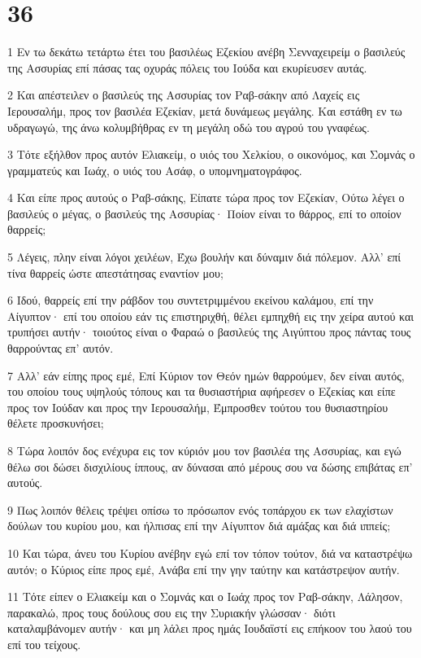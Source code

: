 \chapter{36}

\par 1 Εν τω δεκάτω τετάρτω έτει του βασιλέως Εζεκίου ανέβη Σενναχειρείμ ο βασιλεύς της Ασσυρίας επί πάσας τας οχυράς πόλεις του Ιούδα και εκυρίευσεν αυτάς.
\par 2 Και απέστειλεν ο βασιλεύς της Ασσυρίας τον Ραβ-σάκην από Λαχείς εις Ιερουσαλήμ, προς τον βασιλέα Εζεκίαν, μετά δυνάμεως μεγάλης. Και εστάθη εν τω υδραγωγώ, της άνω κολυμβήθρας εν τη μεγάλη οδώ του αγρού του γναφέως.
\par 3 Τότε εξήλθον προς αυτόν Ελιακείμ, ο υιός του Χελκίου, ο οικονόμος, και Σομνάς ο γραμματεύς και Ιωάχ, ο υιός του Ασάφ, ο υπομνηματογράφος.
\par 4 Και είπε προς αυτούς ο Ραβ-σάκης, Είπατε τώρα προς τον Εζεκίαν, Ούτω λέγει ο βασιλεύς ο μέγας, ο βασιλεύς της Ασσυρίας· Ποίον είναι το θάρρος, επί το οποίον θαρρείς;
\par 5 Λέγεις, πλην είναι λόγοι χειλέων, Έχω βουλήν και δύναμιν διά πόλεμον. Αλλ' επί τίνα θαρρείς ώστε απεστάτησας εναντίον μου;
\par 6 Ιδού, θαρρείς επί την ράβδον του συντετριμμένου εκείνου καλάμου, επί την Αίγυπτον· επί του οποίου εάν τις επιστηριχθή, θέλει εμπηχθή εις την χείρα αυτού και τρυπήσει αυτήν· τοιούτος είναι ο Φαραώ ο βασιλεύς της Αιγύπτου προς πάντας τους θαρρούντας επ' αυτόν.
\par 7 Αλλ' εάν είπης προς εμέ, Επί Κύριον τον Θεόν ημών θαρρούμεν, δεν είναι αυτός, του οποίου τους υψηλούς τόπους και τα θυσιαστήρια αφήρεσεν ο Εζεκίας και είπε προς τον Ιούδαν και προς την Ιερουσαλήμ, Έμπροσθεν τούτου του θυσιαστηρίου θέλετε προσκυνήσει;
\par 8 Τώρα λοιπόν δος ενέχυρα εις τον κύριόν μου τον βασιλέα της Ασσυρίας, και εγώ θέλω σοι δώσει δισχιλίους ίππους, αν δύνασαι από μέρους σου να δώσης επιβάτας επ' αυτούς.
\par 9 Πως λοιπόν θέλεις τρέψει οπίσω το πρόσωπον ενός τοπάρχου εκ των ελαχίστων δούλων του κυρίου μου, και ήλπισας επί την Αίγυπτον διά αμάξας και διά ιππείς;
\par 10 Και τώρα, άνευ του Κυρίου ανέβην εγώ επί τον τόπον τούτον, διά να καταστρέψω αυτόν; ο Κύριος είπε προς εμέ, Ανάβα επί την γην ταύτην και κατάστρεψον αυτήν.
\par 11 Τότε είπεν ο Ελιακείμ και ο Σομνάς και ο Ιωάχ προς τον Ραβ-σάκην, Λάλησον, παρακαλώ, προς τους δούλους σου εις την Συριακήν γλώσσαν· διότι καταλαμβάνομεν αυτήν· και μη λάλει προς ημάς Ιουδαϊστί εις επήκοον του λαού του επί του τείχους.
